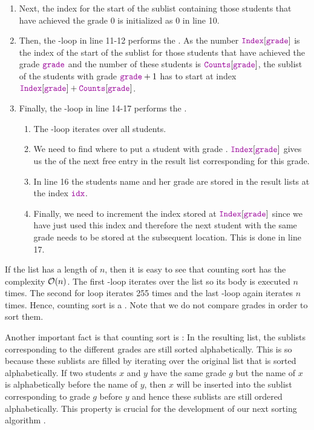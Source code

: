 \begin{enumerate}
\item Next, the index for the start of the sublist containing those students that have achieved the grade $0$
      is initialized as $0$ in line 10. 
\item Then, the -loop in line 11-12 performs the . As the number
      $\mytt{Index}[\mytt{grade}]$ is the index of the start of the sublist for those students that have
      achieved the grade  $\mytt{grade}$ and the number of these
      students is $\mytt{Counts}[\mytt{grade}]$, the sublist of the students with grade $\mytt{grade}+1$
      has to start at index 
      \\[0.2cm]
      \hspace*{1.3cm}
      $\mytt{Index}[\mytt{grade}] + \mytt{Counts}[\mytt{grade}]$.
\item Finally, the -loop in line 14-17 performs the .
      \begin{enumerate}
      \item The -loop iterates over all students. 
      \item We need to find where to put a student with grade .
            $\mytt{Index}[\mytt{grade}]$ gives us the  of the next free entry in the
            result list  corresponding for this grade.
      \item In line 16 the students name and her grade are stored in the result lists 
            at the index $\mytt{idx}$.
      \item Finally, we need to increment the index stored at $\mytt{Index}[\mytt{grade}]$ since we have
            just used this index and therefore the next student with the same grade needs to be
            stored at the subsequent location.  This is done in line 17.
      \end{enumerate}
\end{enumerate}
If the list  has a length of $n$, then it is easy to
see that counting sort has the complexity $\mathcal{O}(n)$.  The first -loop iterates over the list  so
its body is executed $n$ times.  The second for loop iterates 255 times and the last -loop again
iterates $n$ times.  Hence, counting sort is a .  Note that we do not compare grades in
order to sort them.

Another important fact is that counting sort is : In the resulting list, the sublists
corresponding to the different grades are still sorted alphabetically.  This is so because these sublists are
filled by iterating over the original list that is sorted alphabetically.  If two students $x$ and $y$ have the
same grade $g$ but the name of $x$ is alphabetically before the name of $y$, then $x$ will be inserted into the
sublist corresponding to grade $g$ before $y$ and hence these sublists are still ordered alphabetically.  This property
is crucial for the development of our next sorting algorithm .

